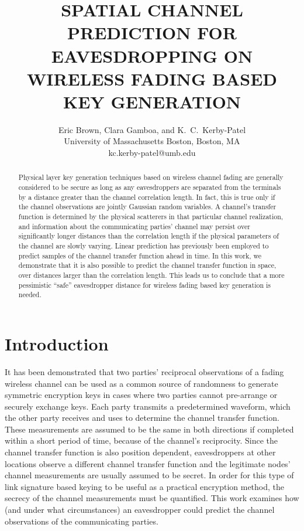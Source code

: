 \documentclass{allertonproc}
\title{SPATIAL CHANNEL PREDICTION FOR EAVESDROPPING ON WIRELESS FADING BASED KEY GENERATION} %
\author{Eric Brown, Clara Gamboa, and K.~C.~Kerby-Patel\\University of Massachusetts Boston, Boston, MA\\kc.kerby-patel@umb.edu} %
\date{} %
\begin{document}
\maketitle


\begin{abstract}

Physical layer key generation techniques based on wireless channel fading are generally considered to be secure as long as any eavesdroppers are separated from the terminals by a distance greater than the channel correlation length.  In fact, this is true only if the channel observations are jointly Gaussian random variables.  A channel's transfer function is determined by the physical scatterers in that particular channel realization, and information about the communicating parties' channel may persist over significantly longer distances than the correlation length if the physical parameters of the channel are slowly varying.  Linear prediction has previously been employed to predict samples of the channel transfer function ahead in time.  In this work, we demonstrate that it is also possible to predict the channel transfer function in space, over distances larger than the correlation length.  This leads us to conclude that a more pessimistic ``safe'' eavesdropper distance for wireless fading based key generation is needed.
\end{abstract}


\section{Introduction}
It has been demonstrated \cite{azimisadjadi2007, bloch2008, mathur2008, ye2010} that two parties' reciprocal observations of a fading wireless channel can be used as a common source of randomness to generate symmetric encryption keys in cases where two parties cannot pre-arrange or securely exchange keys.  Each party transmits a predetermined waveform, which the other party receives and uses to determine the channel transfer function.  These measurements are assumed to be the same in both directions if completed within a short period of time, because of the channel's reciprocity.  Since the channel transfer function is also position dependent, eavesdroppers at other locations observe a different channel transfer function and the legitimate nodes' channel measurements are usually assumed to be secret.  In order for this type of link signature based keying to be useful as a practical encryption method, the secrecy of the channel measurements must be quantified.  This work examines how (and under what circumstances) an eavesdropper could predict the channel observations of the communicating parties.
\end{document}
